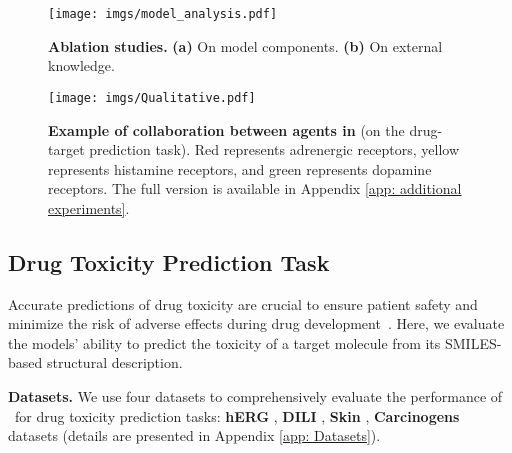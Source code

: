 \begin{figure}[t]
    \centering
    \texttt{[image: imgs/model\_analysis.pdf]}
    \vspace{-1ex}
    \caption{\textbf{Ablation studies.} \textbf{(a)} On model components. \textbf{(b)} On external knowledge.}
    \label{fig: model analysis}
    \vspace{-2ex}
\end{figure}

\begin{figure*}[t]
\vspace{-8pt}
    \centering
\texttt{[image: imgs/Qualitative.pdf]}
\vspace{-2ex}
    \caption{\textbf{Example of collaboration between agents in \proposed} (on the drug-target prediction task). Red represents adrenergic receptors, yellow represents histamine receptors, and green represents dopamine receptors. The full version is available in Appendix \ref{app: additional experiments}.
    }
    \label{fig: case studies}
    \vspace{-8pt}
\end{figure*}


\vspace{-1ex}
\subsection{Drug Toxicity Prediction Task}
\label{exp:Drug Toxicity Prediction Task}
Accurate predictions of drug toxicity are crucial to ensure patient safety and minimize the risk of adverse effects during drug development~\cite{basile2019artificial}.
Here, we evaluate the models' ability to predict the toxicity of a target molecule from its SMILES-based structural description.

\textbf{Datasets.}
We use four datasets to comprehensively evaluate the performance of \proposed~for drug toxicity prediction tasks: \textbf{hERG} \cite{wang2016admet}, \textbf{DILI} \cite{xu2015deep}, \textbf{Skin} \cite{alves2015predicting}, \textbf{Carcinogens} \cite{lagunin2009computer} datasets (details are presented in Appendix \ref{app: Datasets}).

